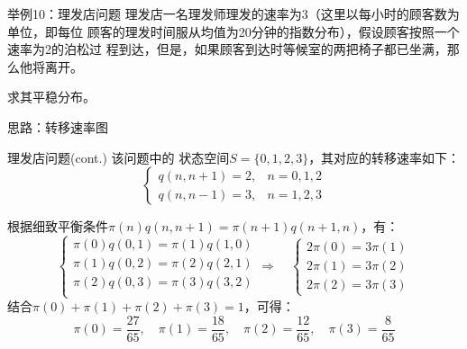 \documentclass[t]{beamer}
\begin{document}
\begin{frame}{举例10：理发店问题}
  理发店一名理发师理发的速率为3（这里以每小时的顾客数为单位，即每位
  顾客的理发时间服从均值为20分钟的指数分布），假设顾客按照一个速率为2的泊松过
  程到达，但是，如果顾客到达时等候室的两把椅子都已坐满，那么他将离开。
  
  求其平稳分布。

\begin{block}{思路：转移速率图}
  \centering
\end{block}

\end{frame}


\begin{frame}{理发店问题(cont.)}
  该问题中的
  状态空间$S=\{0,1,2,3\}$，其对应的转移速率如下：
  \[\begin{cases}
  q(n,n+1)=2,& n=0,1,2\\
  q(n,n-1)=3,& n=1,2,3
  \end{cases} \]	
  
  根据细致平衡条件$\pi(n)q(n,n+1)=\pi(n+1)q(n+1,n)$，有：
  \[\begin{cases}
  \pi(0)q(0,1)=\pi(1)q(1,0)\\
  \pi(1)q(0,2)=\pi(2)q(2,1)\\
  \pi(2)q(0,3)=\pi(3)q(3,2)\\
  \end{cases} \Rightarrow\quad 
  \begin{cases}
  2\pi(0)=3\pi(1)\\
  2\pi(1)=3\pi(2)\\
  2\pi(2)=3\pi(3)
  \end{cases} \]
  结合$\pi(0)+\pi(1)+\pi(2)+\pi(3)=1$，可得：
  \[\pi(0)=\frac{27}{65},\quad \pi(1)=\frac{18}{65},\quad \pi(2)=\frac{12}{65},\quad \pi(3)=\frac{8}{65} \]
  
\end{frame}
\end{document}
